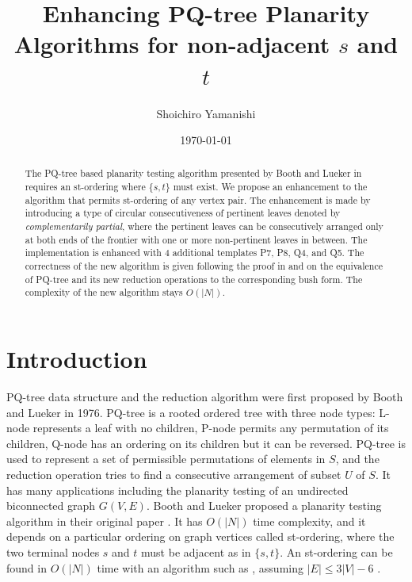 \documentclass[a4]{jgaa-art}
\title{Enhancing PQ-tree Planarity Algorithms for non-adjacent $s$ and $t$ }
\author{Shoichiro Yamanishi}
\date{\today}
\begin{document}
\maketitle

\begin{abstract}
The PQ-tree based planarity testing algorithm presented
by Booth and Lueker in \cite{BL76} requires an st-ordering where $\{s,t\}$ must exist.
We propose an enhancement to the algorithm that permits st-ordering of any vertex pair.
The enhancement is made by introducing a type of circular consecutiveness of pertinent 
leaves denoted by  {\it complementarily partial},
 where the pertinent leaves can be consecutively arranged only at both ends of the frontier with 
one or more non-pertinent leaves in between. 
The implementation is enhanced with 4 additional templates P7, P8, Q4, and Q5.
The correctness of the new algorithm is given following the proof in
 \cite{EVEN79} and \cite{LEC67} 
on the equivalence of PQ-tree and its new reduction operations to the corresponding bush form.
The complexity of the new algorithm stays $O(|N|)$.
\end{abstract}

\section{Introduction}\label{se:intro}


PQ-tree data structure and the reduction algorithm were first proposed by Booth and Lueker \cite{BL76} 
in 1976.
PQ-tree is a rooted ordered tree with three node types: L-node represents a leaf with no children, P-node 
permits any permutation of its children, Q-node has an ordering on its children but it can be reversed.
PQ-tree is used to represent a set of permissible permutations of elements in $S$, and the reduction
operation tries to find a consecutive arrangement of subset $U$ of $S$.
It has many applications including the planarity testing of an undirected biconnected graph $G(V,E)$.
Booth and Lueker proposed a planarity testing algorithm in their original paper \cite{BL76}.
It has $O(|N|)$ time complexity, and it depends on a particular ordering on graph vertices called st-ordering,
where the two terminal nodes $s$ and $t$ must be adjacent as in $\{s,t\}$.
An st-ordering can be found in $O(|N|)$ time with an algorithm such as \cite{TARJAN86}, assuming $|E| \le 3|V| - 6$ .
\end{document}
